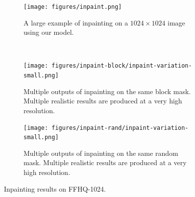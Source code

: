 \begin{figure}[ht]
    \centering
    \begin{subfigure}[b]{\textwidth}
        \centering
        \label{fig:inpaintExample}
        \texttt{[image: figures/inpaint.png]}
        \caption{A large example of inpainting on a $1024 \times 1024$ image using our
        model.}
    \end{subfigure}
    \\
    \begin{subfigure}[b]{0.47\textwidth}
        \centering
        \texttt{[image: figures/inpaint-block/inpaint-variation-small.png]}
        \caption{
            Multiple outputs of inpainting on the same block mask. Multiple
            realistic results are produced at a very high resolution.
        }
    \end{subfigure}
    \hfill
    \begin{subfigure}[b]{0.47\textwidth}
        \centering
        \texttt{[image: figures/inpaint-rand/inpaint-variation-small.png]}
        \caption{
            Multiple outputs of inpainting on the same random mask. Multiple
            realistic results are produced at a very high resolution.
        }
    \end{subfigure}
    \caption{Inpainting results on FFHQ-1024.}
\end{figure}

